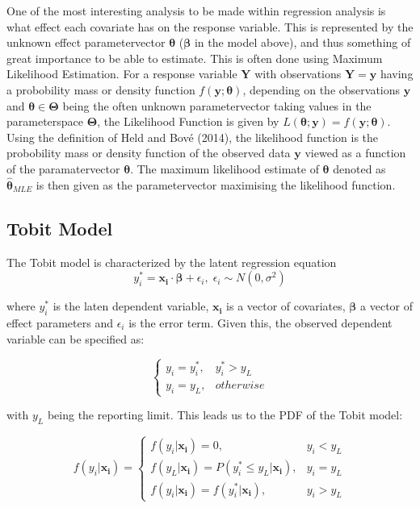 \documentclass[]{article}
\begin{document}
One of the most interesting analysis to be made within regression
analysis is what effect each covariate has on the response variable.
This is represented by the unknown effect parametervector
\(\mathbf{\theta}\) (\(\mathbf{\beta}\) in the model above), and thus
something of great importance to be able to estimate. This is often done
using Maximum Likelihood Estimation. For a response variable
\(\mathbf{Y}\) with observations \(\mathbf{Y} = \mathbf{y}\) having a
probobility mass or density function \(f(\mathbf{y};\mathbf{\theta})\),
depending on the observations \(\mathbf{y}\) and
\(\mathbf{\theta} \in \mathbf{\Theta}\) being the often unknown
parametervector taking values in the parameterspace \(\mathbf{\Theta}\),
the Likelihood Function is given by
\(L(\mathbf{\theta;\mathbf{y}}) = f(\mathbf{y};\mathbf{\theta})\). Using
the definition of Held and Bové (2014), the likelihood function is the
probobility mass or density function of the observed data \(\mathbf{y}\)
viewed as a function of the paramatervector \(\mathbf{\theta}\). The
maximum likelihood estimate of \(\mathbf{\theta}\) denoted as
\(\mathbf{\hat{\theta}}_{MLE}\) is then given as the parametervector
maximising the likelihood function.

\hypertarget{tobit-model}{%
\subsection{Tobit Model}\label{tobit-model}}

The Tobit model is characterized by the latent regression equation \[
y_i^* = \mathbf{x_i}\cdot\mathbf{\beta} + \epsilon_i, \; \epsilon_i \sim N(0, \sigma^2)
\]

where \(y_i^*\) is the laten dependent variable, \(\mathbf{x_i}\) is a
vector of covariates, \(\mathbf{\beta}\) a vector of effect parameters
and \(\epsilon_i\) is the error term. Given this, the observed dependent
variable can be specified as:

\[
\begin{cases}
y_i = y_i^*, & y_i^* > y_L \\
y_i = y_L, & otherwise
\end{cases}
\]

with \(y_L\) being the reporting limit. This leads us to the PDF of the
Tobit model:

\[
f(y_i|\mathbf{x_i}) = \begin{cases}
f(y_i|\mathbf{x_i}) = 0, & y_i<y_L\\
f(y_L|\mathbf{x_i}) = P(y_i^* \leq y_L|\mathbf{x_i}), & y_i=y_L\\
 f(y_i|\mathbf{x_i})=f(y_i^*|\mathbf{x_i}), & y_i>y_L
\end{cases}
\]
\end{document}
